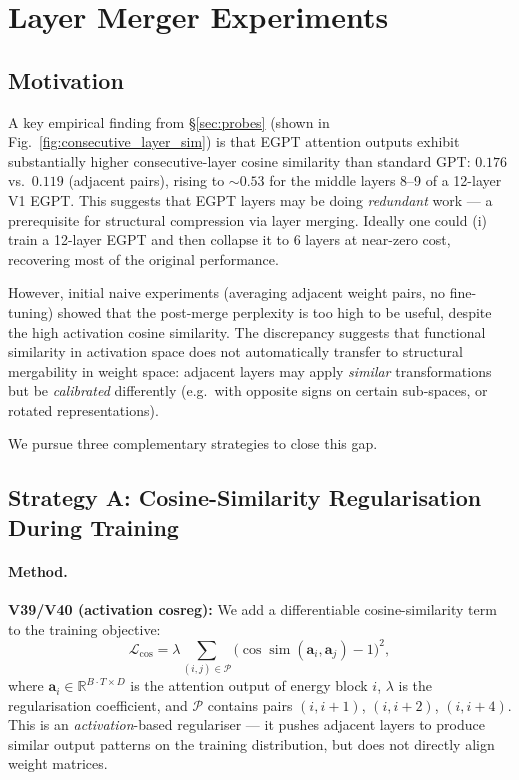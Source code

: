 \section{Layer Merger Experiments}
\label{sec:layer_merger}

\subsection{Motivation}

A key empirical finding from \S\ref{sec:probes} (shown in Fig.~\ref{fig:consecutive_layer_sim}) is that
EGPT attention outputs exhibit substantially higher consecutive-layer cosine similarity than
standard GPT: $0.176$ vs.\ $0.119$ (adjacent pairs), rising to $\sim 0.53$ for the middle
layers 8--9 of a 12-layer V1 EGPT.  This suggests that EGPT layers may be doing
\emph{redundant} work --- a prerequisite for structural compression via layer merging.
Ideally one could (i) train a 12-layer EGPT and then collapse it to 6 layers at near-zero
cost, recovering most of the original performance.

However, initial naive experiments (averaging adjacent weight pairs, no fine-tuning)
showed that the post-merge perplexity is too high to be useful, despite the high activation
cosine similarity.  The discrepancy suggests that functional similarity in activation space
does not automatically transfer to structural mergability in weight space: adjacent layers
may apply \emph{similar} transformations but be \emph{calibrated} differently (e.g.\ with
opposite signs on certain sub-spaces, or rotated representations).

We pursue three complementary strategies to close this gap.

\subsection{Strategy A: Cosine-Similarity Regularisation During Training}
\label{sec:cosreg}

\paragraph{Method.}
\textbf{V39/V40 (activation cosreg):}
We add a differentiable cosine-similarity term to the training objective:
\begin{equation}
  \mathcal{L}_{\mathrm{cos}} = \lambda \sum_{(i,j)\in\mathcal{P}}
      \bigl(\cos\!\operatorname{sim}(\mathbf{a}_i, \mathbf{a}_j) - 1\bigr)^2 ,
\end{equation}
where $\mathbf{a}_i\in\mathbb{R}^{B\cdot T\times D}$ is the attention output of energy block $i$,
$\lambda$ is the regularisation coefficient, and $\mathcal{P}$ contains pairs
$(i,i{+}1)$, $(i,i{+}2)$, $(i,i{+}4)$.
This is an \emph{activation}-based regulariser — it pushes adjacent layers to produce
similar output patterns on the training distribution, but does not directly align weight matrices.

